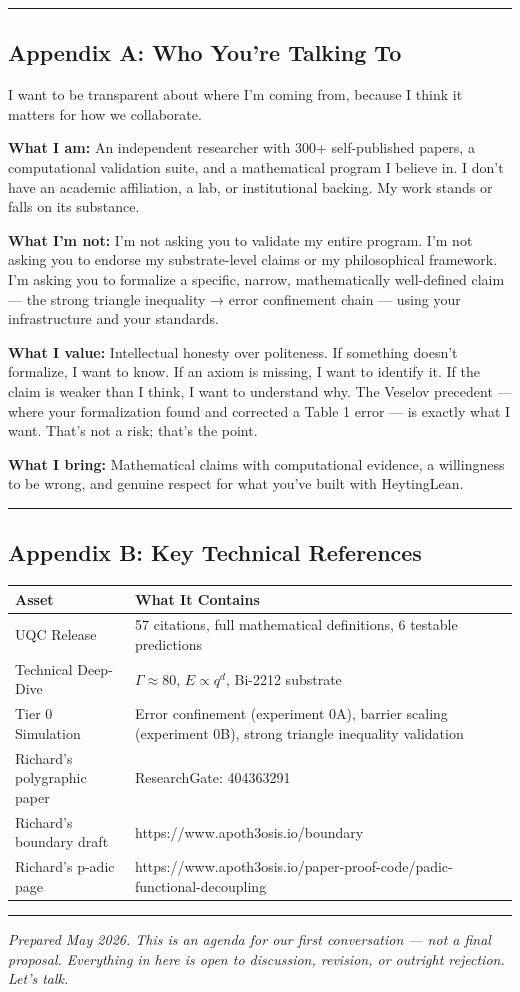 \documentclass[11pt,a4paper]{article}
\begin{document}
\bigskip
\noindent\rule{\textwidth}{0.4pt}
\bigskip
\subsection*{Appendix A: Who You're Talking To}

I want to be transparent about where I'm coming from, because I think it matters for how we collaborate.

\textbf{What I am:} An independent researcher with 300+ self-published papers, a computational validation suite, and a mathematical program I believe in. I don't have an academic affiliation, a lab, or institutional backing. My work stands or falls on its substance.

\textbf{What I'm not:} I'm not asking you to validate my entire program. I'm not asking you to endorse my substrate-level claims or my philosophical framework. I'm asking you to formalize a specific, narrow, mathematically well-defined claim — the strong triangle inequality → error confinement chain — using your infrastructure and your standards.

\textbf{What I value:} Intellectual honesty over politeness. If something doesn't formalize, I want to know. If an axiom is missing, I want to identify it. If the claim is weaker than I think, I want to understand why. The Veselov precedent — where your formalization found and corrected a Table 1 error — is exactly what I want. That's not a risk; that's the point.

\textbf{What I bring:} Mathematical claims with computational evidence, a willingness to be wrong, and genuine respect for what you've built with HeytingLean.

\bigskip
\noindent\rule{\textwidth}{0.4pt}
\bigskip
\subsection*{Appendix B: Key Technical References}

\begin{center}
\begin{longtable}{|l|l|}
\hline
\textbf{Asset} & \textbf{What It Contains} \\ \hline
\endhead
UQC Release & 57 citations, full mathematical definitions, 6 testable predictions \\ \hline
Technical Deep-Dive & $\Gamma \approx 80$, $E \propto q^d$, Bi-2212 substrate \\ \hline
Tier 0 Simulation & Error confinement (experiment 0A), barrier scaling (experiment 0B), strong triangle inequality validation \\ \hline
Richard's polygraphic paper & ResearchGate: 404363291 \\ \hline
Richard's boundary draft & https://www.apoth3osis.io/boundary \\ \hline
Richard's p-adic page & https://www.apoth3osis.io/paper-proof-code/padic-functional-decoupling \\ \hline
\end{longtable}
\end{center}

\bigskip
\noindent\rule{\textwidth}{0.4pt}
\bigskip
\textit{Prepared May 2026. This is an agenda for our first conversation — not a final proposal. Everything in here is open to discussion, revision, or outright rejection. Let's talk.}
\end{document}
